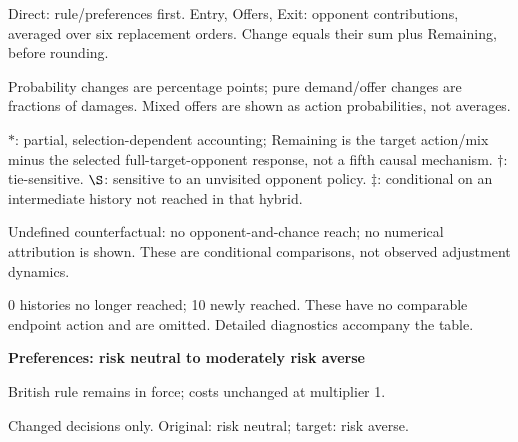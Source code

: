 \documentclass[10pt]{article}
\begin{document}
{\footnotesize Direct: rule/preferences first. Entry, Offers, Exit: opponent contributions, averaged over six replacement orders. Change equals their sum plus Remaining, before rounding.\par
Probability changes are percentage points; pure demand/offer changes are fractions of damages. Mixed offers are shown as action probabilities, not averages.\par
$*$: partial, selection-dependent accounting; Remaining is the target action/mix minus the selected full-target-opponent response, not a fifth causal mechanism. $\dagger$: tie-sensitive. $\S$: sensitive to an unvisited opponent policy. $\ddagger$: conditional on an intermediate history not reached in that hybrid.\par
Undefined counterfactual: no opponent-and-chance reach; no numerical attribution is shown. These are conditional comparisons, not observed adjustment dynamics.\par
0 histories no longer reached; 10 newly reached. These have no comparable endpoint action and are omitted. Detailed diagnostics accompany the table.}\par
\clearpage
{\large\bfseries Preferences: risk neutral to moderately risk averse}\par
British rule remains in force; costs unchanged at multiplier 1.\par
{\small Changed decisions only. Original: risk neutral; target: risk averse.}\par
\end{document}
